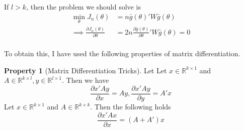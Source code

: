 \documentclass[12pt]{article}
\theoremstyle{definition}
\theoremstyle{property}
\newtheorem{property}{Property}[section]
\theoremstyle{assumption}
\theoremstyle{example}
\theoremstyle{comment}
\begin{document}
If $l>k$, then the problem we should solve is
\[
\begin{aligned}
\min_\theta J_n(\theta)&=n\bar{g}(\theta)'W\bar{g}(\theta)\\
\implies\frac{\partial J_n(\theta)}{\partial \theta}& =2n\frac{\partial \bar{g}(\theta)}{\partial\theta}'W\bar{g}(\theta)=0\\
\end{aligned}
\]\par 
To obtain this, I have used the following properties of matrix differentiation.
\begin{mdframed}[backgroundcolor=green!5] 
\begin{property}[Matrix Differentiation Tricks]
Let Let $x\in\mathbb{R}^{k\times 1}$ and $A\in\mathbb{R}^{k\times l}, y\in\mathbb{R}^{l\times 1}$. Then we have
\[
\frac{\partial x'Ay}{\partial x}=Ay, \frac{\partial x'Ay}{\partial y}=A'x
\]Let $x\in\mathbb{R}^{k\times 1}$ and $A\in\mathbb{R}^{k\times k}$. Then the following holds
\[
\frac{\partial x'Ax}{\partial x}=(A+A')x
\]
\end{property}
\end{mdframed}
\end{document}
